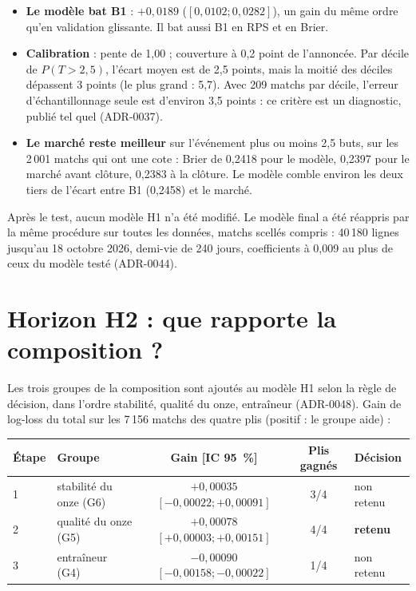 \begin{itemize}
  \item \textbf{Le modèle bat B1} : \(+0{,}0189\) (\([0{,}0102 ; 0{,}0282]\)), un gain du même ordre qu'en
        validation glissante. Il bat aussi B1 en RPS et en Brier.
  \item \textbf{Calibration} : pente de 1,00 ; couverture à 0,2 point de l'annoncée. Par décile de
        \(P(T > 2{,}5)\), l'écart moyen est de 2,5 points, mais la moitié des déciles dépassent 3 points
        (le plus grand : 5,7). Avec 209 matchs par décile, l'erreur d'échantillonnage seule est
        d'environ 3,5 points : ce critère est un diagnostic, publié tel quel (ADR-0037).
  \item \textbf{Le marché reste meilleur} sur l'événement plus ou moins 2,5 buts, sur les 2\,001 matchs
        qui ont une cote : Brier de 0,2418 pour le modèle, 0,2397 pour le marché avant clôture, 0,2383 à
        la clôture. Le modèle comble environ les deux tiers de l'écart entre B1 (0,2458) et le marché.
\end{itemize}

Après le test, aucun modèle H1 n'a été modifié. Le modèle final a été réappris par la même procédure sur
toutes les données, matchs scellés compris : 40\,180 lignes jusqu'au 18 octobre 2026, demi-vie de 240
jours, coefficients à 0,009 au plus de ceux du modèle testé (ADR-0044).

\section{Horizon H2 : que rapporte la composition ?}
\label{sec:resultats-h2}

Les trois groupes de la composition sont ajoutés au modèle H1 selon la règle de décision, dans l'ordre
stabilité, qualité du onze, entraîneur (ADR-0048). Gain de log-loss du total sur les 7\,156 matchs des
quatre plis (positif : le groupe aide) :

\begin{center}
\begin{tabular}{llccl}
\toprule
Étape & Groupe & Gain [IC 95~\%] & Plis gagnés & Décision \\
\midrule
1 & stabilité du onze (G6) & \(+0{,}00035\) \([-0{,}00022 ; +0{,}00091]\) & 3/4 & non retenu \\
2 & qualité du onze (G5) & \(+0{,}00078\) \([+0{,}00003 ; +0{,}00151]\) & 4/4 & \textbf{retenu} \\
3 & entraîneur (G4) & \(-0{,}00090\) \([-0{,}00158 ; -0{,}00022]\) & 1/4 & non retenu \\
\bottomrule
\end{tabular}
\end{center}

